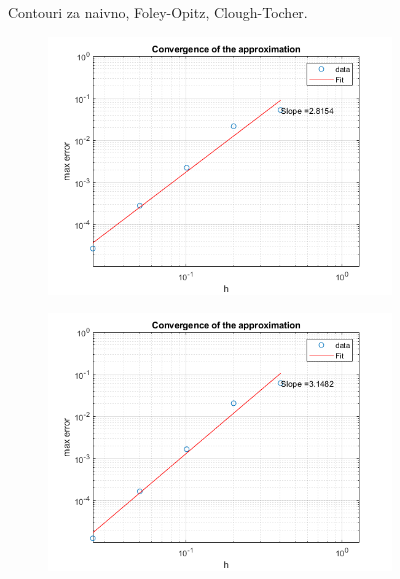 \documentclass{article}
\begin{document}
\begin{figure}[H]
\begin{subfigure}{.3\textwidth}
\end{subfigure}
\caption*{Contouri za naivno, Foley-Opitz, Clough-Tocher.}
\end{figure}

\begin{figure}[H]
\centering
\begin{subfigure}{.3\textwidth}
\includegraphics[width=\linewidth]{slike/conv1.png}
\end{subfigure}
\begin{subfigure}{.3\textwidth}
\includegraphics[width=\linewidth]{slike/conv2.png}
\end{subfigure}
\begin{subfigure}{.3\textwidth}

\end{subfigure}
\end{figure}
\end{document}
